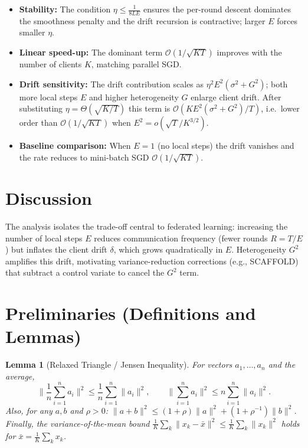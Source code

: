 \documentclass[11pt]{article}
\newtheorem{lemma}{Lemma}
\begin{document}
\begin{itemize}
\item \textbf{Stability:} The condition $\eta \le \tfrac{1}{8LE}$ ensures the
      per-round descent dominates the smoothness penalty and the drift
      recursion is contractive; larger $E$ forces smaller $\eta$.
\item \textbf{Linear speed-up:} The dominant term $\mathcal{O}(1/\sqrt{KT})$
      improves with the number of clients $K$, matching parallel SGD.
\item \textbf{Drift sensitivity:} The drift contribution scales as
      $\eta^2 E^2 (\sigma^2 + G^2)$; both more local steps $E$ and higher
      heterogeneity $G$ enlarge client drift. After substituting
      $\eta=\Theta(\sqrt{K/T})$ this term is $\mathcal{O}(KE^2(\sigma^2+G^2)/T)$,
      i.e.\ lower order than $\mathcal{O}(1/\sqrt{KT})$ when
      $E^2 = o(\sqrt{T}/K^{3/2})$.
\item \textbf{Baseline comparison:} When $E=1$ (no local steps) the drift
      vanishes and the rate reduces to mini-batch SGD $\mathcal{O}(1/\sqrt{KT})$.
\end{itemize}

\section*{Discussion}
The analysis isolates the trade-off central to federated learning:
increasing the number of local steps $E$ reduces communication frequency
(fewer rounds $R = T/E$) but inflates the client drift $\delta$, which grows
quadratically in $E$. Heterogeneity $G^2$ amplifies this drift, motivating
variance-reduction corrections (e.g., SCAFFOLD) that subtract a control
variate to cancel the $G^2$ term.

\section*{Preliminaries (Definitions and Lemmas)}

\begin{lemma}[Relaxed Triangle / Jensen Inequality]\label{lem:jensen}
For vectors $a_1,\dots,a_n$ and the average,
\[
\Big\|\frac{1}{n}\sum_{i=1}^n a_i\Big\|^2
\le \frac{1}{n}\sum_{i=1}^n \|a_i\|^2,
\qquad
\Big\|\sum_{i=1}^n a_i\Big\|^2 \le n\sum_{i=1}^n\|a_i\|^2 .
\]
Also, for any $a,b$ and $\rho>0$:
$\|a+b\|^2 \le (1+\rho)\|a\|^2 + (1+\rho^{-1})\|b\|^2$.
Finally, the variance-of-the-mean bound
$\frac{1}{K}\sum_k\|x_k-\bar x\|^2 \le \frac1K\sum_k\|x_k\|^2$
holds for $\bar x = \frac1K\sum_k x_k$.
\end{lemma}
\end{document}
